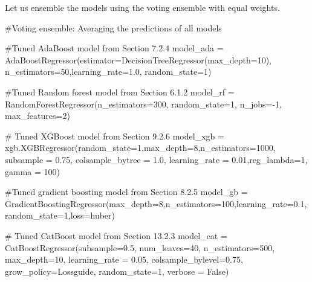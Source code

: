 \documentclass[
  letterpaper,
  DIV=11,
  numbers=noendperiod]{scrreprt}
\newenvironment{Shaded}{\begin{snugshade}}{\end{snugshade}}
\newcommand{\CommentTok}[1]{\textcolor[rgb]{0.37,0.37,0.37}{#1}}
\newcommand{\DecValTok}[1]{\textcolor[rgb]{0.68,0.00,0.00}{#1}}
\newcommand{\FloatTok}[1]{\textcolor[rgb]{0.68,0.00,0.00}{#1}}
\newcommand{\NormalTok}[1]{\textcolor[rgb]{0.00,0.23,0.31}{#1}}
\newcommand{\OperatorTok}[1]{\textcolor[rgb]{0.37,0.37,0.37}{#1}}
\newcommand{\StringTok}[1]{\textcolor[rgb]{0.13,0.47,0.30}{#1}}
\newcommand{\VariableTok}[1]{\textcolor[rgb]{0.07,0.07,0.07}{#1}}
\begin{document}
Let us ensemble the models using the voting ensemble with equal weights.

\begin{Shaded}
\begin{Highlighting}[]
\CommentTok{\#Voting ensemble: Averaging the predictions of all models}

\CommentTok{\#Tuned AdaBoost model from Section 7.2.4}
\NormalTok{model\_ada }\OperatorTok{=}\NormalTok{ AdaBoostRegressor(estimator}\OperatorTok{=}\NormalTok{DecisionTreeRegressor(max\_depth}\OperatorTok{=}\DecValTok{10}\NormalTok{),}
\NormalTok{                    n\_estimators}\OperatorTok{=}\DecValTok{50}\NormalTok{,learning\_rate}\OperatorTok{=}\FloatTok{1.0}\NormalTok{,  random\_state}\OperatorTok{=}\DecValTok{1}\NormalTok{)}

\CommentTok{\#Tuned Random forest model from Section 6.1.2}
\NormalTok{model\_rf }\OperatorTok{=}\NormalTok{ RandomForestRegressor(n\_estimators}\OperatorTok{=}\DecValTok{300}\NormalTok{, random\_state}\OperatorTok{=}\DecValTok{1}\NormalTok{,}
\NormalTok{                        n\_jobs}\OperatorTok{={-}}\DecValTok{1}\NormalTok{, max\_features}\OperatorTok{=}\DecValTok{2}\NormalTok{)}

\CommentTok{\# Tuned XGBoost model from Section 9.2.6}
\NormalTok{model\_xgb }\OperatorTok{=}\NormalTok{ xgb.XGBRegressor(random\_state}\OperatorTok{=}\DecValTok{1}\NormalTok{,max\_depth}\OperatorTok{=}\DecValTok{8}\NormalTok{,n\_estimators}\OperatorTok{=}\DecValTok{1000}\NormalTok{, subsample }\OperatorTok{=} \FloatTok{0.75}\NormalTok{, }
\NormalTok{                colsample\_bytree }\OperatorTok{=} \FloatTok{1.0}\NormalTok{, learning\_rate }\OperatorTok{=} \FloatTok{0.01}\NormalTok{,reg\_lambda}\OperatorTok{=}\DecValTok{1}\NormalTok{, gamma }\OperatorTok{=} \DecValTok{100}\NormalTok{)}

\CommentTok{\#Tuned gradient boosting model from Section 8.2.5}
\NormalTok{model\_gb }\OperatorTok{=}\NormalTok{ GradientBoostingRegressor(max\_depth}\OperatorTok{=}\DecValTok{8}\NormalTok{,n\_estimators}\OperatorTok{=}\DecValTok{100}\NormalTok{,learning\_rate}\OperatorTok{=}\FloatTok{0.1}\NormalTok{,}
\NormalTok{                         random\_state}\OperatorTok{=}\DecValTok{1}\NormalTok{,loss}\OperatorTok{=}\StringTok{\textquotesingle{}huber\textquotesingle{}}\NormalTok{)}

\CommentTok{\# Tuned CatBoost model from Section 13.2.3}
\NormalTok{model\_cat }\OperatorTok{=}\NormalTok{ CatBoostRegressor(subsample}\OperatorTok{=}\FloatTok{0.5}\NormalTok{, num\_leaves}\OperatorTok{=}\DecValTok{40}\NormalTok{, n\_estimators}\OperatorTok{=}\DecValTok{500}\NormalTok{, max\_depth}\OperatorTok{=}\DecValTok{10}\NormalTok{,}
\NormalTok{                             learning\_rate }\OperatorTok{=} \FloatTok{0.05}\NormalTok{, colsample\_bylevel}\OperatorTok{=}\FloatTok{0.75}\NormalTok{, grow\_policy}\OperatorTok{=}\StringTok{\textquotesingle{}Lossguide\textquotesingle{}}\NormalTok{,}
\NormalTok{                             random\_state}\OperatorTok{=}\DecValTok{1}\NormalTok{, verbose }\OperatorTok{=} \VariableTok{False}\NormalTok{)}


\end{Highlighting}
\end{Shaded}
\end{document}
